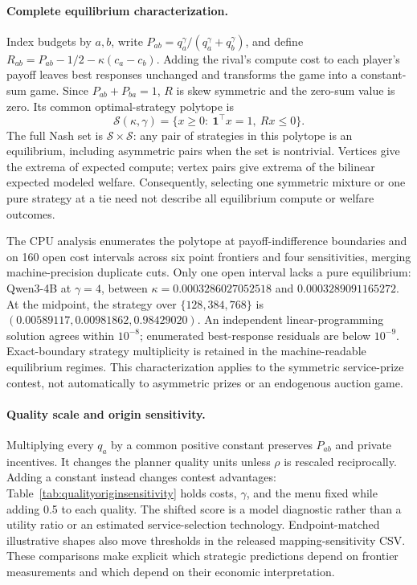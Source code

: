 \documentclass{article}
\begin{document}
\paragraph{Complete equilibrium characterization.}
Index budgets by $a,b$, write $P_{ab}=q_a^\gamma/(q_a^\gamma+q_b^\gamma)$, and define $R_{ab}=P_{ab}-1/2-\kappa(c_a-c_b)$. Adding the rival's compute cost to each player's payoff leaves best responses unchanged and transforms the game into a constant-sum game. Since $P_{ab}+P_{ba}=1$, $R$ is skew symmetric and the zero-sum value is zero. Its common optimal-strategy polytope is
\begin{equation}
 \mathcal S(\kappa,\gamma)=\{x\geq0:\ \mathbf 1^\top x=1,\ Rx\leq0\}.
 \label{eq:equilibriumpolytope}
\end{equation}
The full Nash set is $\mathcal S\times\mathcal S$: any pair of strategies in this polytope is an equilibrium, including asymmetric pairs when the set is nontrivial. Vertices give the extrema of expected compute; vertex pairs give extrema of the bilinear expected modeled welfare. Consequently, selecting one symmetric mixture or one pure strategy at a tie need not describe all equilibrium compute or welfare outcomes.

The CPU analysis enumerates the polytope at payoff-indifference boundaries and on 160 open cost intervals across six point frontiers and four sensitivities, merging machine-precision duplicate cuts. Only one open interval lacks a pure equilibrium: Qwen3-4B at $\gamma=4$, between $\kappa=0.0003286027052518$ and $0.0003289091165272$. At the midpoint, the strategy over $\{128,384,768\}$ is $(0.00589117,0.00981862,0.98429020)$. An independent linear-programming solution agrees within $10^{-8}$; enumerated best-response residuals are below $10^{-9}$. Exact-boundary strategy multiplicity is retained in the machine-readable equilibrium regimes. This characterization applies to the symmetric service-prize contest, not automatically to asymmetric prizes or an endogenous auction game.

\paragraph{Quality scale and origin sensitivity.}
Multiplying every $q_a$ by a common positive constant preserves $P_{ab}$ and private incentives. It changes the planner quality units unless $\rho$ is rescaled reciprocally. Adding a constant instead changes contest advantages: Table~\ref{tab:qualityoriginsensitivity} holds costs, $\gamma$, and the menu fixed while adding 0.5 to each quality. The shifted score is a model diagnostic rather than a utility ratio or an estimated service-selection technology. Endpoint-matched illustrative shapes also move thresholds in the released mapping-sensitivity CSV. These comparisons make explicit which strategic predictions depend on frontier measurements and which depend on their economic interpretation.

\end{document}

